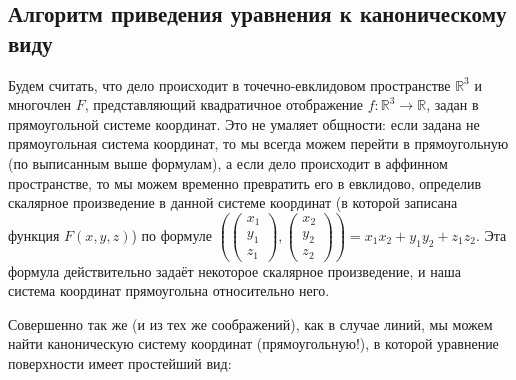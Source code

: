 \documentclass[a4paper, 12pt]{article}
\theoremstyle{definition}
\begin{document}
\subsection{Алгоритм приведения уравнения к каноническому виду}
Будем считать, что дело происходит в точечно-евклидовом пространстве $\mathbb{R}^3$ и многочлен $F$, представляющий квадратичное отображение $f: \mathbb{R}^3 \to \mathbb{R}$, задан в прямоугольной системе координат. Это не умаляет общности: если задана не прямоугольная система координат, то мы всегда можем перейти в прямоугольную (по выписанным выше формулам), а если дело происходит в аффинном пространстве, то мы можем временно превратить его в евклидово, определив скалярное произведение в данной системе координат (в которой записана функция $F(x,y,z)$) по формуле $\left(
     \begin{pmatrix}
        x_1 \\ y_1 \\ z_1
     \end{pmatrix},
     \begin{pmatrix}
        x_2 \\ y_2 \\ z_2
     \end{pmatrix}
\right)
= x_1 x_2 + y_1 y_2 + z_1 z_2$.
Эта формула действительно задаёт некоторое скалярное произведение, и наша система координат прямоугольна относительно него.

Совершенно так же (и из тех же соображений), как в случае линий, мы можем найти каноническую систему координат (прямоугольную!), в которой уравнение поверхности имеет простейший вид:
\end{document}
